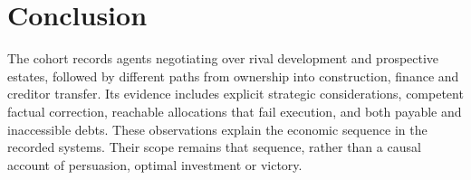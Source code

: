 \section{Conclusion}

The cohort records agents negotiating over rival development and prospective estates, followed by different paths from ownership into construction, finance and creditor transfer. Its evidence includes explicit strategic considerations, competent factual correction, reachable allocations that fail execution, and both payable and inaccessible debts. These observations explain the economic sequence in the recorded systems. Their scope remains that sequence, rather than a causal account of persuasion, optimal investment or victory.
